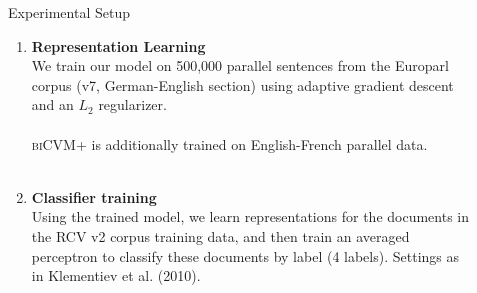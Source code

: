 \documentclass[final]{beamer}
\newlength{\sepwid}
\newlength{\onecolwid}
\newcommand{\biCVMplus}{\textsc{biCVM+}\xspace}
\begin{document}
\begin{frame}[t]
\begin{columns}[t]
\begin{column}{\onecolwid}
      \begin{block}{Experimental Setup}
        ~\\
    \begin{enumerate}
      \item \textbf{Representation Learning}\\
        We train our model on 500,000 parallel sentences from the Europarl
        corpus (v7, German-English section) using adaptive gradient descent and
        an $L_2$ regularizer.\\
        ~\\
        \biCVMplus is additionally trained on English-French parallel
        data.
        ~\\
        ~\\
      \item \textbf{Classifier training}\\
        Using the trained model, we learn representations for the documents in
        the RCV v2 corpus training data, and then train an averaged perceptron
        to classify these documents by label (4 labels). Settings as in
        Klementiev et al. (2010).
    \end{enumerate}
      \end{block}


    \end{column} %

  \begin{column}{\sepwid}\end{column} %

    \begin{column}{\onecolwid} %


\end{column}
\end{columns}
\end{frame}
\end{document}
